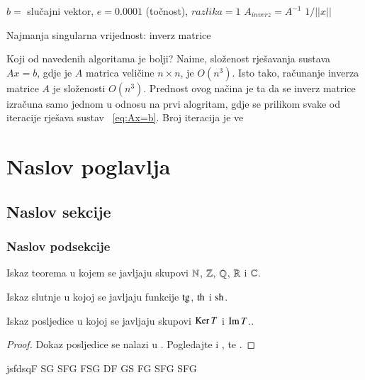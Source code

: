 \documentclass[a4paper,twoside,12pt]{memoir} %
\begin{document}
\begin{algorithm}[H]
\SetAlgoLined
{}
 	$b=$ slučajni vektor,  $e = 0.0001$ (točnost), $razlika = 1$\;
 	$A_{inverz}=A^{-1}$ \;
 	\Return $1/||x||$
 \caption{Najmanja singularna vrijednost: inverz matrice }
\end{algorithm}
\newpage

Koji od navedenih algoritama je bolji? Naime, složenost rješavanja sustava $Ax=b$, gdje je $A$ matrica veličine $n \times n$, je $O(n^{3})$. Isto tako, računanje inverza matrice $A$ je složenosti $O(n^{3})$. Prednost ovog načina je ta da se inverz matrice izračuna samo jednom u odnosu na prvi alogritam, gdje se prilikom svake od iteracije rješava sustav ~\ref{eq:Ax=b}. Broj iteracija je ve



\chapter[Naslov poglavlja u sadržaju][Kratki naslov poglavlja]{Naslov poglavlja}	

\section[Naslov sekcije u sadržaju][Kratki naslov sekcije]{Naslov sekcije}
\subsection{Naslov podsekcije}
\begin{thm}
Iskaz teorema u kojem se javljaju skupovi  $\mathbb{N}$, $\mathbb{Z}$, $\mathbb{Q}$, $\mathbb{R}$ i $\mathbb{C}$.
\end{thm}
\begin{conj}
Iskaz slutnje u kojoj se javljaju funkcije $\operatorname{tg}$, $\operatorname{th}$ i $\operatorname{sh}$.
\end{conj}
\begin{cor}
Iskaz posljedice u kojoj se javljaju skupovi $\operatorname{Ker} T$ i $\operatorname{Im} T$..
\end{cor}
\begin{proof}
Dokaz posljedice se nalazi u \cite{kljuc}. Pogledajte i \cite{kurepa1956convex}, \cite{kurepa1981funkcionalna} te \cite{bempp}.
\end{proof}
jsfdsqF
SG
SFG
FSG
DF
GS
FG
SFG
SFG
\end{document}
